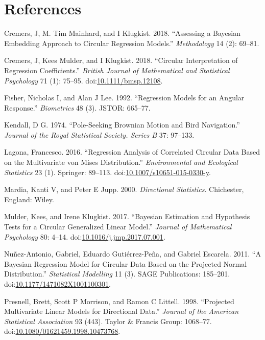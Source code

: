 \documentclass[11pt,]{article}
\begin{document}
\newpage

\section*{References}

\hypertarget{refs}{}
\hypertarget{ref-Cremers2018Assessing}{}
Cremers, J, M. Tim Mainhard, and I Klugkist. 2018. ``Assessing a
Bayesian Embedding Approach to Circular Regression Models.''
\emph{Methodology} 14 (2): 69--81.

\hypertarget{ref-CremersMulderKlugkist2017}{}
Cremers, J, Kees Mulder, and I Klugkist. 2018. ``Circular Interpretation
of Regression Coefficients.'' \emph{British Journal of Mathematical and
Statistical Psychology} 71 (1): 75--95.
doi:\href{https://doi.org/10.1111/bmsp.12108}{10.1111/bmsp.12108}.

\hypertarget{ref-fisher1992regression}{}
Fisher, Nicholas I, and Alan J Lee. 1992. ``Regression Models for an
Angular Response.'' \emph{Biometrics} 48 (3). JSTOR: 665--77.

\hypertarget{ref-kendall1974}{}
Kendall, D G. 1974. ``Pole-Seeking Brownian Motion and Bird
Navigation.'' \emph{Journal of the Royal Statistical Society. Series B}
37: 97--133.

\hypertarget{ref-lagona2016regression}{}
Lagona, Francesco. 2016. ``Regression Analysis of Correlated Circular
Data Based on the Multivariate von Mises Distribution.''
\emph{Environmental and Ecological Statistics} 23 (1). Springer:
89--113.
doi:\href{https://doi.org/10.1007/s10651-015-0330-y}{10.1007/s10651-015-0330-y}.

\hypertarget{ref-mardia2000directional}{}
Mardia, Kanti V, and Peter E Jupp. 2000. \emph{Directional Statistics}.
Chichester, England: Wiley.

\hypertarget{ref-mulder2017bayesian}{}
Mulder, Kees, and Irene Klugkist. 2017. ``Bayesian Estimation and
Hypothesis Tests for a Circular Generalized Linear Model.''
\emph{Journal of Mathematical Psychology} 80: 4--14.
doi:\href{https://doi.org/10.1016/j.jmp.2017.07.001}{10.1016/j.jmp.2017.07.001}.

\hypertarget{ref-nunez2011bayesian}{}
Nuñez-Antonio, Gabriel, Eduardo Gutiérrez-Peña, and Gabriel Escarela.
2011. ``A Bayesian Regression Model for Circular Data Based on the
Projected Normal Distribution.'' \emph{Statistical Modelling} 11 (3).
SAGE Publications: 185--201.
doi:\href{https://doi.org/10.1177/1471082X1001100301}{10.1177/1471082X1001100301}.

\hypertarget{ref-presnell1998projected}{}
Presnell, Brett, Scott P Morrison, and Ramon C Littell. 1998.
``Projected Multivariate Linear Models for Directional Data.''
\emph{Journal of the American Statistical Association} 93 (443). Taylor
\& Francis Group: 1068--77.
doi:\href{https://doi.org/10.1080/01621459.1998.10473768}{10.1080/01621459.1998.10473768}.
\end{document}
